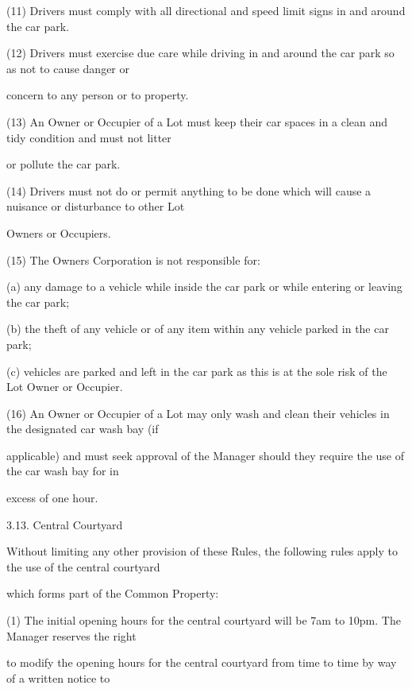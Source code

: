 \documentclass{article}
\begin{document}
{\fontsize{9.962}{1}(11) Drivers must comply with all directional and speed limit signs in and around the car park. }

{\fontsize{9.962}{1}(12) Drivers must exercise due care while driving in and around the car park so as not to cause danger or }

{\fontsize{10.02}{1}concern to any person or to property. }

{\fontsize{9.962}{1}(13) An Owner or Occupier of a Lot must keep their car spaces in a clean and tidy condition and must not litter }

{\fontsize{10.02}{1}or pollute the car park. }

{\fontsize{9.962}{1}(14) Drivers must not do or permit anything to be done which will cause a nuisance or disturbance to other Lot }

{\fontsize{10.02}{1}Owners or Occupiers. }

{\fontsize{9.962}{1}(15) The Owners Corporation is not responsible for: }

{\fontsize{9.962}{1}(a) any damage to a vehicle while inside the car park or while entering or leaving the car park; }

{\fontsize{9.962}{1}(b) the theft of any vehicle or of any item within any vehicle parked in the car park; }

{\fontsize{9.962}{1}(c) vehicles are parked and left in the car park as this is at the sole risk of the Lot Owner or Occupier. }

{\fontsize{9.962}{1}(16) An Owner or Occupier of a Lot may only wash and clean their vehicles in the designated car wash bay (if }

{\fontsize{10.02}{1}applicable) and must seek approval of the Manager should they require the use of the car wash bay for in }

{\fontsize{10.02}{1}excess of one hour. }

{\fontsize{9.99}{1}3.13. Central Courtyard }

{\fontsize{10.02}{1}Without limiting any other provision of these Rules, the following rules apply to the use of the central courtyard }

{\fontsize{10.02}{1}which forms part of the Common Property: }

{\fontsize{9.962}{1}(1) The initial opening hours for the central courtyard will be 7am to 10pm. The Manager reserves the right }

{\fontsize{10.02}{1}to modify the opening hours for the central courtyard from time to time by way of a written notice to }
\end{document}
